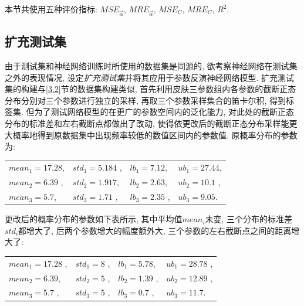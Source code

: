 \documentclass[a4paper,punct=banjiao,twoside]{ctexrep}
\theoremstyle{plain}
\theoremstyle{definition}
\theoremstyle{remark}
\begin{document}
本节共使用五种评价指标: $MSE_{\vec{\alpha}}$, $MRE_{\vec{\alpha}}$, $MSE_{C}$, $MRE_{C}$, $R^2$.

\subsection*{扩充测试集}
由于测试集和神经网络训练时所使用的数据集是同源的, 欲考察神经网络在测试集之外的表现情况, 设定\textit{扩充测试集}并将其应用于参数反演神经网络模型. 
扩充测试集的构建与\ref{3.2}节的数据集构建类似, 首先利用皮肤三参数组内各参数的截断正态分布分别对三个参数进行独立的采样, 再取三个参数采样集合的笛卡尔积, 得到标签集.
但为了测试网络模型的在更广的参数空间内的泛化能力, 对此处的截断正态分布的标准差和左右截断点都做出了改动, 使得依更改后的截断正态分布采样能更大概率地得到原数据集中出现频率较低的数值区间内的参数值.
原概率分布的参数为:
\begin{table}[htbp]
  \centering
  \begin{tabular}[t]{|l*{3}{l}}

    $mean_1 = 17.28$, &$std_1 = 5.184$ ,&$lb_1 = 7.12$, &$ub_1 =27.44$,  \\ 
  
    $mean_2 = 6.39$ , &$std_2 = 1.917$, &$lb_2 = 2.63$, &$ ub_2 =10.1$ , \\ 
  
    $mean_3 = 5.7$, &$std_3 = 1.71$ , &$lb_3 = 2.35$ ,&$ub_3 =9.05$. \\ 

  \end{tabular}
\end{table}  

\noindent 更改后的概率分布的参数如下表所示, 其中平均值$mean_i$未变, 三个分布的标准差$std_i$都增大了, 后两个参数增大的幅度额外大, 三个参数的左右截断点之间的距离增大了:

\begin{table}[htbp]
  \centering
  \begin{tabular}[t]{|l*{3}{l}}

    $mean_1 = 17.28$ ,&$std_1 = 8$ ,&$lb_1 = 5.78$, &$ub_1 =28.78$ , \\ 
  
    $mean_2 = 6.39$,  &$std_2 = 5$ ,&$lb_2 = 1.39$ ,&$ ub_2 =12.89$ , \\ 
  
    $mean_3 = 5.7$ ,&$std_3 = 5$ , &$lb_3 = 0.7$ ,&$ub_3 =11.7$. \\ 

  \end{tabular}
\end{table}  
\end{document}
